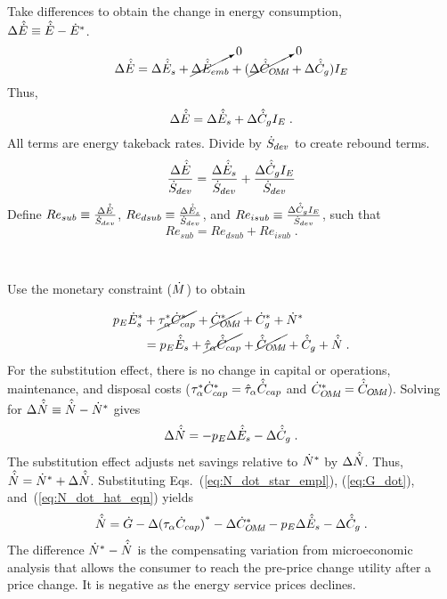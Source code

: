\begin{landscape}
{Take differences to obtain the change in energy consumption, \\
$\Delta \hat{\dot{E}} \equiv \hat{\dot{E}} - {\dot{E}}^*$.
%
\begin{equation}
  \Delta \hat{\dot{E}} = \Delta \hat{\dot{E}}_s 
                      + \cancelto{0}{\Delta \hat{\dot{E}}_{emb}} 
                      + (\cancelto{0}{\Delta \hat{\dot{C}}_{O\!M\!d}} + \Delta \hat{\dot{C}}_g) I_E
\end{equation}
%
Thus, 
%
\begin{equation}
  \Delta \hat{\dot{E}} = \Delta \hat{\dot{E}}_s + \Delta \hat{\dot{C}}_g I_E \; .
\end{equation}
%
All terms are energy takeback rates.
Divide by $\dot{S}_{dev}$
to create rebound terms.
%
\begin{equation}
    \frac{\Delta \hat{\dot{E}}}{\dot{S}_{dev}} = \frac{\Delta \hat{\dot{E}}_s}{\dot{S}_{dev}} + \frac{\Delta \hat{\dot{C}}_g I_E}{\dot{S}_{dev}}
\end{equation}
%
Define 
$Re_{sub} \equiv \frac{\Delta \hat{\dot{E}}}{\dot{S}_{dev}}$, 
$Re_{dsub} \equiv \frac{\Delta \hat{\dot{E}}_s}{\dot{S}_{dev}}$, and
$Re_{isub} \equiv \frac{\Delta \hat{\dot{C}}_g I_E}{\dot{S}_{dev}}$,
such that
%
\begin{equation} \label{eq:Re_sub_def}
  Re_{sub} = Re_{dsub} + Re_{isub} \; .
\end{equation}

}
{
~
  
Use the monetary constraint ($\dot{M}$) to obtain

\begin{align}
  p_E {\dot{E}}^*_s &+ \cancel{{\tau}^*_\alpha {\dot{C}}^*_{cap}} + \cancel{{\dot{C}}^*_{O\!M\!d}} + {\dot{C}}^*_g + {\dot{N}}^* \nonumber \\
                   &= p_E \hat{\dot{E}}_s + \cancel{\hat{\tau}_\alpha \hat{\dot{C}}_{cap}} + \cancel{\hat{\dot{C}}_{O\!M\!d}} + \hat{\dot{C}}_g + \hat{\dot{N}} \; .
\end{align}
%
For the substitution effect, there is no change in capital or operations, maintenance, and disposal costs
(${\tau}^*_\alpha {\dot{C}}^*_{cap} = \hat{\tau}_\alpha \hat{\dot{C}}_{cap}$ and 
${\dot{C}}^*_{O\!M\!d} = \hat{\dot{C}}_{O\!M\!d}$).
Solving for $\Delta \hat{\dot{N}} \equiv \hat{\dot{N}} - {\dot{N}}^*$ gives
%
\begin{equation} \label{eq:N_dot_hat_eqn}
  \Delta \hat{\dot{N}} = - p_E \Delta \hat{\dot{E}}_s - \Delta \hat{\dot{C}}_g \; .
\end{equation}
%
The substitution effect adjusts net savings relative to ${\dot{N}}^*$
by $\Delta \hat{\dot{N}}$.
Thus, $\hat{\dot{N}} = {\dot{N}}^* + \Delta \hat{\dot{N}}$.
Substituting Eqs.~(\ref{eq:N_dot_star_empl}), (\ref{eq:G_dot}), and~(\ref{eq:N_dot_hat_eqn})
yields
%
\begin{equation} \label{eq:N_dot_after_sub}
  \hat{\dot{N}} = \dot{G} - \Delta {(\tau_\alpha \dot{C}_{cap})}^* - \Delta {\dot{C}}^*_{O\!M\!d} - p_E \Delta \hat{\dot{E}}_s - \Delta \hat{\dot{C}}_g \; .
\end{equation}
%
The difference ${\dot{N}}^* - \hat{\dot{N}}$
is the compensating variation 
from microeconomic analysis that allows the consumer 
to reach the pre-price change utility
after a price change. 
It is negative as the energy service prices declines.
}

\end{landscape}

\restoregeometry

